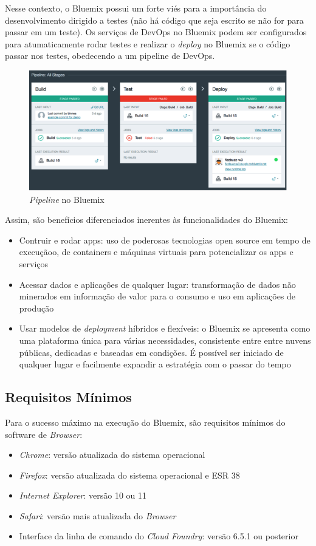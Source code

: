 Nesse contexto, o Bluemix possui um forte viés para a importância do desenvolvimento dirigido a testes (não há código que seja escrito se não for para passar em um teste). Os serviços de DevOps no Bluemix podem ser configurados para atumaticamente rodar testes e realizar o \textit{deploy} no Bluemix se o código passar nos testes, obedecendo a um pipeline de DevOps.
\begin{figure}[!htb]
    \centering
    \includegraphics{imagens/pipeline}
    \caption{\textit{Pipeline} no Bluemix}
    \label{Rotulo}
\end{figure}

Assim, são benefícios diferenciados inerentes às funcionalidades do Bluemix:
\begin{itemize}
    \item	Contruir e rodar apps: uso de poderosas tecnologias open source em tempo de execuçãoo, de containers e máquinas virtuais para potencializar os apps e serviços
    \item	Acessar dados e aplicações de qualquer lugar: transformação de dados não minerados em informação de valor para o consumo e uso em aplicações de produção
    \item	Usar modelos de \textit{deployment} híbridos e flexíveis: o Bluemix se apresenta como uma plataforma única para várias necessidades, consistente entre entre nuvens públicas, dedicadas e baseadas em condições. É possível ser iniciado de qualquer lugar e facilmente expandir a estratégia com o passar do tempo
\end{itemize}

\subsection{Requisitos Mínimos}

Para o sucesso máximo na execução do Bluemix, são requisitos mínimos do software de \textit{Browser}:
\begin{itemize}
    \item	\textit{Chrome}: versão atualizada do sistema operacional
    \item	\textit{Firefox}: versão atualizada do sistema operacional e ESR 38
    \item	\textit{Internet Explorer}: versão 10 ou 11
    \item	\textit{Safari}: versão mais atualizada do \textit{Browser}
    \item	Interface da linha de comando do \textit{Cloud Foundry}: versão 6.5.1 ou posterior
\end{itemize}

